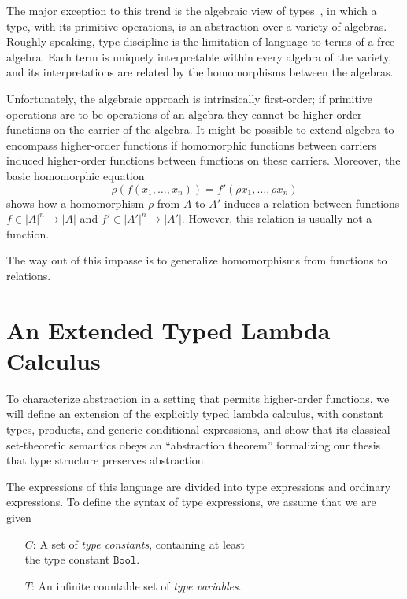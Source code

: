 \documentclass[sigplan,screen,nonacm,balance=false]{acmart}
\theoremstyle{plain}
\newcommand{\Bool}{\mathtt{Bool}}
\begin{document}
The major exception to this trend is the algebraic view of types~\citep{ADTs-GH,ADTs-GTW,ADTs-Kapur}, in which a type, with its primitive operations, is an abstraction over a variety of algebras.
Roughly speaking, type discipline is the limitation of language to terms of a free algebra.
Each term is uniquely interpretable within every algebra of the variety, and its interpretations are related by the homomorphisms between the algebras.

Unfortunately, the algebraic approach is intrinsically first-order; if primitive operations are to be operations of an algebra they cannot be higher-order functions on the carrier of the algebra.
It might be possible to extend algebra to encompass higher-order functions if homomorphic functions between carriers induced higher-order functions between functions on these carriers. Moreover, the basic homomorphic equation
%
\begin{equation*}
  \rho(f(x_1, \dots, x_n)) = f'(\rho x_1, \dots, \rho x_n)
\end{equation*}
%
shows how a homomorphism $\rho$ from $A$ to $A'$ induces a relation between functions $f \in |A|^n \to |A|$ and $f' \in |A'|^n \to |A'|$.
However, this relation is usually not a function.

The way out of this impasse is to generalize homomorphisms from functions to relations.

\section{An Extended Typed Lambda Calculus}

To characterize abstraction in a setting that permits higher-order functions, we will define an extension of the explicitly typed lambda calculus, with constant types, products, and generic conditional expressions, and show that its classical set-theoretic semantics obeys an ``abstraction theorem'' formalizing our thesis that type structure preserves abstraction.

The expressions of this language are divided into type expressions and ordinary expressions.
To define the syntax of type expressions, we assume that we are given

\begin{itemize}[noitemsep,leftmargin=3em]
  \item[$C$:] A set of \emph{type constants}, containing at least \\
    the type constant $\Bool$.
  \item[$T$:] An infinite countable set of \emph{type variables}.
\end{itemize}
\end{document}
